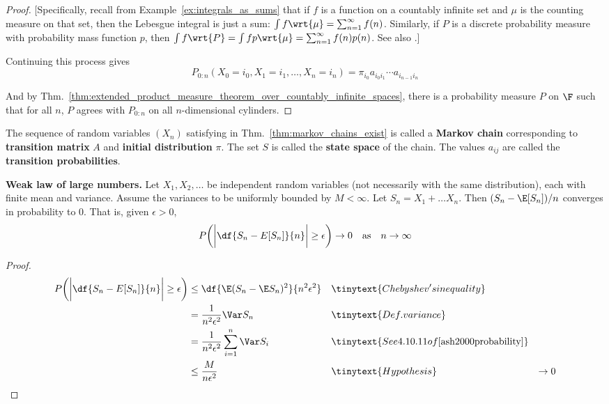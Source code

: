 \documentclass{article} %
\begin{document}
\begin{proof}
{\scriptsize [Specifically, recall from Example~\ref{ex:integrals_as_sums} that if $f$ is a function on a countably infinite set and $\mu$ is the counting measure on that set, then the Lebesgue integral is just a sum: $\int f \wrt{\mu} = \sum_{n=1}^\infty f(n)$.  Similarly, if $P$ is a discrete probability measure with probability mass function $p$, then $\int f \wrt{P} = \int fp \wrt{\mu} = \sum_{n=1}^\infty f(n)p(n)$.  See also \cite[4.10.3(d)]{ash2000probability}.]}

Continuing this process gives
\[P_{0:n}(X_0=i_0, X_1=i_1, \hdots, X_n=i_n) = \pi_{i_0} a_{i_0i_1} \cdots a_{i_{n-1}i_n}\]

And by Thm.~\ref{thm:extended_product_measure_theorem_over_countably_infinite_spaces}, there is a probability measure $P$ on $\F$ such that for all $n$, $P$ agrees with $P_{0:n}$ on all $n$-dimensional cylinders.
\end{proof}

\begin{remark}
The sequence of random variables $(X_n)$ satisfying  in Thm.~\ref{thm:markov_chains_exist} is called a \textbf{Markov chain} corresponding to \textbf{transition matrix} $A$ and \textbf{initial distribution} $\pi$. The set $S$ is called the \textbf{state space} of the chain.  The values $a_{ij}$ are called the \textbf{transition probabilities}.
\end{remark}

\begin{theorem}\textbf{Weak law of large numbers.} Let $X_1, X_2, \hdots$ be independent random variables (not necessarily with the same distribution), each with finite mean and variance. Assume the variances to be uniformly bounded by $M < \infty$.  Let $S_n = X_1 + \hdots X_n$. Then $(S_n - \E[S_n])/n$ converges in probability to 0. That is, given $\epsilon > 0$,
\[  P \bigg(\bigg|\df{S_n - E[S_n]}{n} \bigg|\geq \epsilon \bigg) \to 0 \quad \text{as} \quad n \to \infty \]
\label{thm:weak_law_of_large_numbers}
\end{theorem}

\begin{proof}
\begin{align*}
P \bigg(\bigg|\df{S_n - E[S_n]}{n} \bigg|\geq \epsilon \bigg) &\leq  \df{\E(S_n - \E S_n)^2}{n^2 \epsilon^2} && \tinytext{Chebyshev's inequality}	\\
&= \frac{1}{n^2 \epsilon^2} \Var S_n && \tinytext{Def. variance} \\
&= \frac{1}{n^2 \epsilon^2} \sum_{i=1}^n \Var S_i && \tinytext{See 4.10.11 of \cite{ash2000probability}} \\
& \leq \frac{M}{n \epsilon^2}&& \tinytext{Hypothesis}
& \to 0
\end{align*}

\end{proof}
\end{document}
